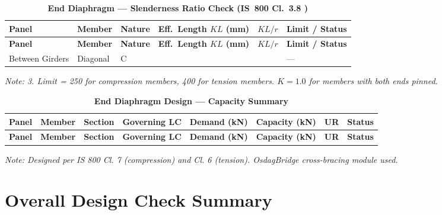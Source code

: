 \documentclass[12pt,a4paper]{report}
\numberwithin{table}{chapter}
\numberwithin{figure}{chapter}
\begin{document}
\vspace{1em}
\begin{longtable}{|C{2.2cm}|L{2.2cm}|L{2.5cm}|C{2.5cm}|C{2.5cm}|>{\centering\arraybackslash}p{3.6cm}|}
\caption{\textbf{End Diaphragm --- Slenderness Ratio Check (IS~800 Cl.~3.8 )}}
\hline
{} \textbf{Panel} & \textbf{Member} & \textbf{Nature} & \textbf{Eff.\ Length $KL$ (mm)} & \textbf{$KL/r$} & \textbf{Limit / Status} \\[6pt]
\hline
\endfirsthead
\hline
{} \textbf{Panel} & \textbf{Member} & \textbf{Nature} & \textbf{Eff.\ Length $KL$ (mm)} & \textbf{$KL/r$} & \textbf{Limit / Status} \\[6pt]
\hline
\endhead
Between Girders & Diagonal & C &  &  &  ---  \\[6pt]
\hline
\end{longtable}
\noindent\textit{Note:  3. Limit = 250 for compression members, 400 for tension members. $K = 1.0$ for members with both ends pinned.}

\vspace{1em}

\begin{longtable}{|C{2.0cm}|L{1.8cm}|C{2.2cm}|C{3.0cm}|C{1.8cm}|C{1.8cm}|C{1.2cm}|C{1.8cm}|}
\caption{\textbf{End Diaphragm Design --- Capacity Summary}}
\hline
{} \textbf{Panel} & \textbf{Member} & \textbf{Section} & \textbf{Governing LC} & \textbf{Demand (kN)} & \textbf{Capacity (kN)} & \textbf{UR} & \textbf{Status} \\[6pt]
\hline
\endfirsthead
\hline
{} \textbf{Panel} & \textbf{Member} & \textbf{Section} & \textbf{Governing LC} & \textbf{Demand (kN)} & \textbf{Capacity (kN)} & \textbf{UR} & \textbf{Status} \\[6pt]
\hline
\endhead

\end{longtable}
\noindent\textit{Note: Designed per IS 800 Cl. 7 (compression) and Cl. 6 (tension). OsdagBridge cross-bracing module used.}

\section{Overall Design Check Summary}
\label{sec:overall-summary}
\end{document}

